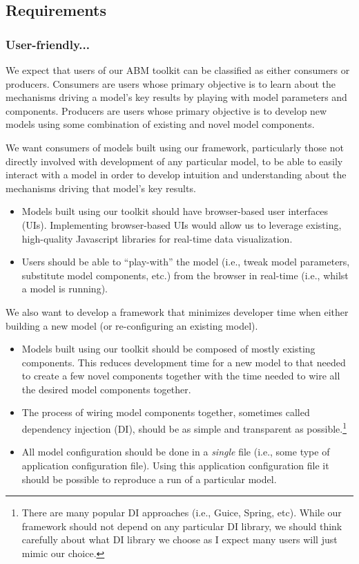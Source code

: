 \documentclass[11pt]{amsart}
\begin{document}
\subsection{Requirements}

\subsubsection{User-friendly...}
We expect that users of our ABM toolkit can be classified as either consumers or producers. Consumers are users whose primary objective is to learn about the mechanisms driving a model's key results by playing with model parameters and components. Producers are users whose primary objective is to develop new models using some combination of existing and novel model components.

We want consumers of models built using our framework, particularly those not directly involved with development of any particular model, to be able to easily interact with a model in order to develop intuition and understanding about the mechanisms driving that model's key results.
\begin{itemize}
    \item Models built using our toolkit should have browser-based user interfaces (UIs). Implementing browser-based UIs would allow us to leverage existing, high-quality Javascript libraries for real-time data visualization.
    \item Users should be able to ``play-with'' the model (i.e., tweak model parameters, substitute model components, etc.) from the browser in real-time (i.e., whilst a model is running).
\end{itemize}

We also want to develop a framework that minimizes developer time when either building a new model (or re-configuring an existing model).
\begin{itemize}
    \item Models built using our toolkit should be composed of mostly existing components. This reduces development time for a new model to that needed to create a few novel components together with the time needed to wire all the desired model components together.
    \item The process of wiring model components together, sometimes called dependency injection (DI), should be as simple and transparent as possible.\footnote{
    There are many popular DI approaches (i.e., Guice, Spring, etc). While our framework should not depend on any particular DI library, we should think carefully about what DI library we choose as I expect many users will just mimic our choice.
    }
    \item All model configuration should be done in a \textit{single} file (i.e., some type of application configuration file).  Using this application configuration file it should be possible to reproduce a run of a particular model.
\end{itemize}
\end{document}

